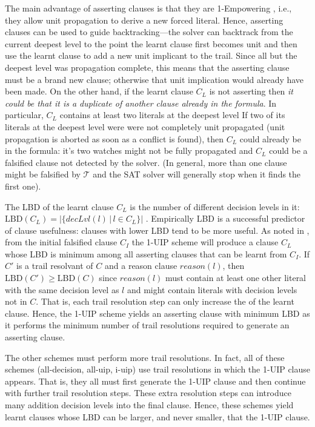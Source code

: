\documentclass[runningheads]{llncs}
\newcommand{\sat}{SAT\xspace}
\newcommand{\LBD}{\text{LBD}\xspace}
\newcommand{\trail}{\ensuremath{\mathcal{T}}}
\newcommand{\dlevel}[1]{\ensuremath{\mathit{decLvl}(#1)}}
\newcommand{\reason}[1]{\ensuremath{\mathit{reason}(#1)}}
\begin{document}
The main advantage of asserting clauses is that they are 1-Empowering
\cite{DBLP:journals/ai/PipatsrisawatD11}, i.e., they allow unit
propagation to derive a new forced literal. Hence, asserting clauses
can be used to guide backtracking---the solver can backtrack from the
current deepest level to the point the learnt clause first becomes
unit and then use the learnt clause to add a new unit implicant to the
trail. Since all but the deepest level was propagation complete, this
means that the asserting clause must be a brand new clause; otherwise
that unit implication would already have been made. On the other hand,
if the learnt clause $C_L$ is not asserting then \emph{it could be
  that it is a duplicate of another clause already in the formula}. In
particular, $C_L$ contains at least two literals at the deepest level
If two of its literals at the deepest level were were not completely
unit propagated (unit propagation is aborted as soon as a conflict is
found), then $C_L$ could already be in the formula: it's two watches
might not be fully propagated and $C_L$ could be a falsified clause
not detected by the solver. (In general, more than one clause might be
falsified by $\trail$ and the \sat solver will generally stop when it
finds the first one).

The LBD of the learnt clause $C_L$ is the number of different decision
levels in it:
$\LBD(C_L)=\left|\big\{\dlevel{l}\,|\,l \in C_L\big\}\right|$
\cite{DBLP:conf/ijcai/AudemardS09}. Empirically LBD is a successful
predictor of clause usefulness: clauses with lower LBD tend to be more
useful. As noted in \cite{DBLP:conf/ijcai/AudemardS09}, from the
initial falsified clause $C_I$ the 1-UIP scheme will produce a clause
$C_L$ whose LBD is minimum among all asserting clauses that can be
learnt from $C_I$. If $C'$ is a trail resolvant of $C$ and a reason
clause $\reason{l}$, then $\LBD(C') \geq \LBD(C)$ since $\reason{l}$
must contain at least one other literal with the same decision level
as $l$ and might contain literals with decision levels not in
$C$. That is, each trail resolution step can only increase the \LBD of
the learnt clause. Hence, the 1-UIP scheme yields an asserting clause
with minimum LBD as it performs the minimum number of trail resolutions
required to generate an asserting clause.

The other schemes must perform more trail resolutions. In fact, all of
these schemes (all-decision, all-uip, i-uip) use trail resolutions in
which the 1-UIP clause appears. That is, they all must first generate
the 1-UIP clause and then continue with further trail resolution
steps. These extra resolution steps can introduce many addition
decision levels into the final clause. Hence, these schemes yield
learnt clauses whose LBD can be larger, and never smaller, that the
1-UIP clause.
\end{document}
